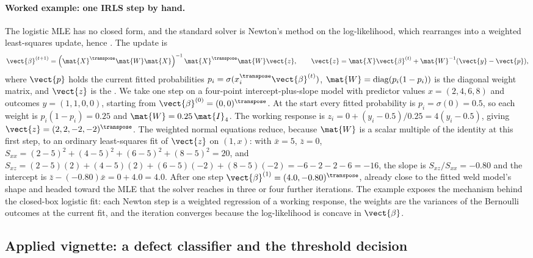 

\paragraph{Worked example: one IRLS step by hand.} The logistic MLE
has no closed form, and the standard solver is Newton's method on
the log-likelihood, which rearranges into a weighted least-squares
update, hence . The
update is
\[
\vect{\beta}^{(t+1)} = \left(\mat{X}^{\transpose}\mat{W}\mat{X}
\right)^{-1}\mat{X}^{\transpose}\mat{W}\vect{z},
\qquad
\vect{z} = \mat{X}\vect{\beta}^{(t)} + \mat{W}^{-1}(\vect{y} -
\vect{p}),
\]
where $\vect{p}$ holds the current fitted probabilities $p_{i} =
\sigma(x_{i}^{\transpose}\vect{\beta}^{(t)})$, $\mat{W} =
\operatorname{diag}(p_{i}(1-p_{i}))$ is the diagonal weight matrix,
and $\vect{z}$ is the . We take one step on
a four-point intercept-plus-slope model with predictor values
$x = (2, 4, 6, 8)$ and outcomes $y = (1, 1, 0, 0)$, starting from
$\vect{\beta}^{(0)} = (0, 0)^{\transpose}$. At the start every
fitted probability is $p_{i} = \sigma(0) = 0.5$, so each weight is
$p_{i}(1-p_{i}) = 0.25$ and $\mat{W} = 0.25\,\mat{I}_{4}$. The
working response is $z_{i} = 0 + (y_{i} - 0.5)/0.25 = 4(y_{i} -
0.5)$, giving $\vect{z} = (2, 2, -2, -2)^{\transpose}$. The
weighted normal equations reduce, because $\mat{W}$ is a scalar
multiple of the identity at this first step, to an ordinary
least-squares fit of $\vect{z}$ on $(1, x)$: with $\bar{x} = 5$,
$\bar{z} = 0$, $S_{xx} = (2-5)^{2} + (4-5)^{2} + (6-5)^{2} + (8-5)^{2}
= 20$, and $S_{xz} = (2-5)(2) + (4-5)(2) + (6-5)(-2) + (8-5)(-2) =
-6 - 2 - 2 - 6 = -16$, the slope is $S_{xz}/S_{xx} = -0.80$ and the
intercept is $\bar{z} - (-0.80)\bar{x} = 0 + 4.0 = 4.0$. After one
step $\vect{\beta}^{(1)} = (4.0, -0.80)^{\transpose}$, already close
to the fitted weld model's shape and headed toward the MLE that the
solver reaches in three or four further iterations. The example
exposes the mechanism behind the closed-box logistic fit: each
Newton step is a weighted regression of a working response, the
weights are the variances of the Bernoulli outcomes at the current
fit, and the iteration converges because the log-likelihood is
concave in $\vect{\beta}$.

\subsection{Applied vignette: a defect classifier and the threshold decision}


